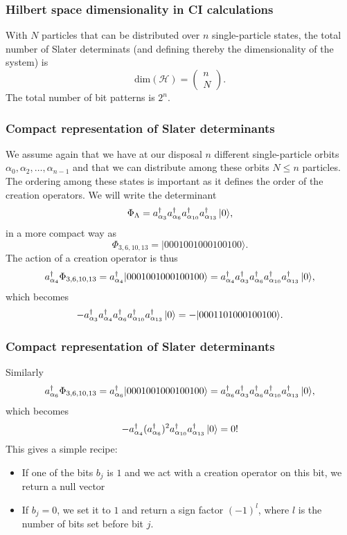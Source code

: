 \frame
{
  \frametitle{Hilbert space dimensionality in CI calculations}
\begin{small}
{\scriptsize
With $N$ particles that can be distributed over $n$ single-particle states, the total number of Slater determinats (and defining thereby the dimensionality of the system) is
\[
\mathrm{dim}(\mathcal{H}) = \left(\begin{array}{c} n \\N\end{array}\right).
\]
The total number of bit patterns is $2^n$. 
}
\end{small}
}

\frame
{
  \frametitle{Compact representation of Slater determinants}
\begin{small}
{\scriptsize
We assume again that we have at our disposal $n$ different single-particle orbits
$\alpha_0,\alpha_2,\dots,\alpha_{n-1}$ and that we can distribute  among these orbits $N\le n$ particles.
The ordering among these states is important as it defines the order of the creation operators.
We will write the determinant 
\[
\Phi_{\Lambda} = a_{\alpha_3}^\dagger a_{\alpha_6}^\dagger a_{\alpha_{10}}^\dagger a_{\alpha_{13}}^\dagger \,|{0}\rangle,
\]
in a more compact way as 
\[
\Phi_{3,6,10,13} = |0001001000100100\rangle.
\]
The action of a creation operator is thus
\[
a^\dagger_{\alpha_4}\Phi_{3,6,10,13} = a^\dagger_{\alpha_4}|0001001000100100\rangle=a^\dagger_{\alpha_4}a_{\alpha_3}^\dagger a_{\alpha_6}^\dagger a_{\alpha_{10}}^\dagger a_{\alpha_{13}}^\dagger \,|{0}\rangle,
\]
which becomes
\[
-a_{\alpha_3}^\dagger a^\dagger_{\alpha_4} a_{\alpha_6}^\dagger a_{\alpha_{10}}^\dagger a_{\alpha_{13}}^\dagger \,|{0}\rangle=-|0001101000100100\rangle.
\]
}
\end{small}
}


\frame
{
  \frametitle{Compact representation of Slater determinants}
\begin{small}
{\scriptsize
Similarly
\[
a^\dagger_{\alpha_6}\Phi_{3,6,10,13} = a^\dagger_{\alpha_6}|0001001000100100\rangle=a^\dagger_{\alpha_6}a_{\alpha_3}^\dagger a_{\alpha_6}^\dagger a_{\alpha_{10}}^\dagger a_{\alpha_{13}}^\dagger \,|{0}\rangle,
\]
which becomes
\[
-a^\dagger_{\alpha_4} (a_{\alpha_6}^\dagger)^ 2 a_{\alpha_{10}}^\dagger a_{\alpha_{13}}^\dagger \,|{0}\rangle=0!
\]
This gives a simple recipe:  
\begin{itemize}
\item If one of the bits $b_j$ is $1$ and we act with a creation operator on this bit, we return a null vector
\item  If $b_j=0$, we set it to $1$ and return a sign factor $(-1)^l$, where $l$ is the number of bits set before bit $j$.
\end{itemize}
}
\end{small}
}



